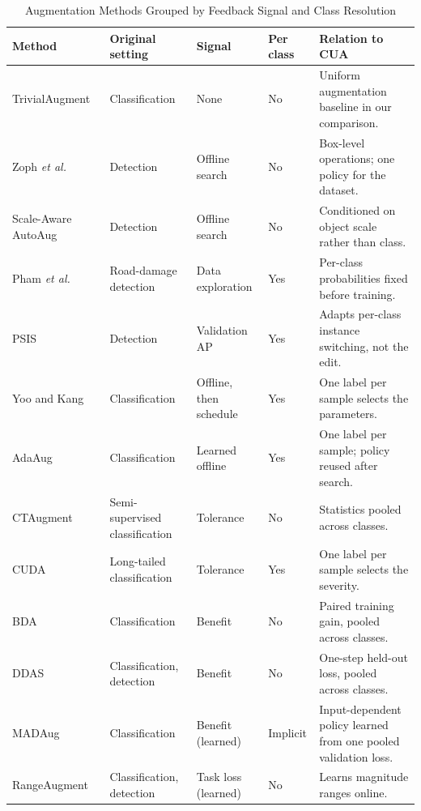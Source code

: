 \documentclass[conference]{IEEEtran}
\begin{document}
\begin{table}[t]
\caption{Augmentation Methods Grouped by Feedback Signal and Class Resolution}
\label{tab:policies}
\centering
\small
\setlength{\tabcolsep}{3.5pt}
\renewcommand{\arraystretch}{1.12}
\begin{tabularx}{\textwidth}{@{}p{}p{}p{}p{}Y@{}}
\toprule
\textbf{Method} & \textbf{Original setting} & \textbf{Signal} & \textbf{Per class} & \textbf{Relation to CUA} \\
\midrule
TrivialAugment~\cite{muller2021trivial} & Classification & None & No & Uniform augmentation baseline in our comparison. \\
Zoph \emph{et al.}~\cite{zoph2020det} & Detection & Offline search & No & Box-level operations; one policy for the dataset. \\
Scale-Aware AutoAug~\cite{chen2021scale} & Detection & Offline search & No & Conditioned on object scale rather than class. \\
Pham \emph{et al.}~\cite{rdd_detectron2} & Road-damage detection & Data exploration & Yes & Per-class probabilities fixed before training. \\
PSIS~\cite{wang2019psis} & Detection & Validation AP & Yes & Adapts per-class instance switching, not the edit. \\
Yoo and Kang~\cite{yoo2023} & Classification & Offline, then schedule & Yes & One label per sample selects the parameters. \\
AdaAug~\cite{cheung2022adaaug} & Classification & Learned offline & Yes & One label per sample; policy reused after search. \\
CTAugment~\cite{berthelot2020} & Semi-supervised classification & Tolerance & No & Statistics pooled across classes. \\
CUDA~\cite{ahn2023cuda} & Long-tailed classification & Tolerance & Yes & One label per sample selects the severity. \\
BDA~\cite{lu2023bda} & Classification & Benefit & No & Paired training gain, pooled across classes. \\
DDAS~\cite{liu2021ddas} & Classification, detection & Benefit & No & One-step held-out loss, pooled across classes. \\
MADAug~\cite{hou2023madaug} & Classification & Benefit (learned) & Implicit & Input-dependent policy learned from one pooled validation loss. \\
RangeAugment~\cite{mehta2022rangeaugment} & Classification, detection & Task loss (learned) & No & Learns magnitude ranges online. \\

\end{tabularx}
\end{table}
\end{document}
